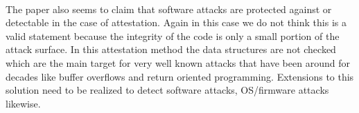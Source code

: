 \paragraph*{}%
The paper also seems to claim that software attacks are protected against or detectable in the case of attestation. Again in this case we do not think this is a valid statement because the integrity of the code is only a small portion of the attack surface. In this attestation method the data structures are not checked which are the main target for very well known attacks that have been around for decades like buffer overflows and return oriented programming. Extensions to this solution need to be realized to detect software attacks, OS/firmware attacks likewise.